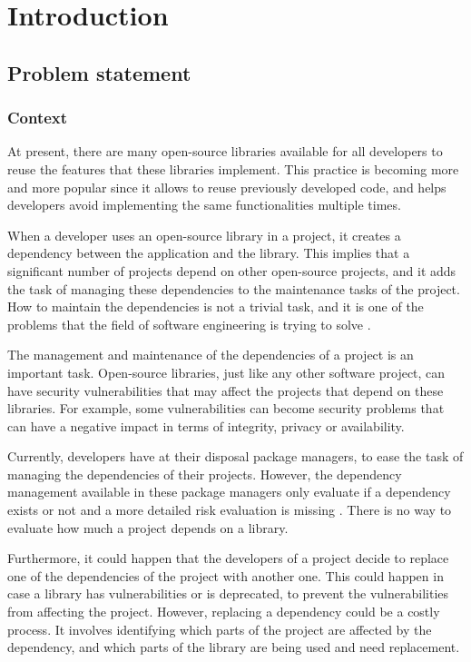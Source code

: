 \chapter{Introduction}\label{ch:Introduction}

\section{Problem statement}

\subsection{Context}
At present, there are many open-source libraries available for all developers to reuse the features that these libraries implement. This practice is becoming more and more popular since it allows to reuse previously developed code, and helps developers avoid implementing the same functionalities multiple times.

When a developer uses an open-source library in a project, it creates a dependency between the application and the library. This implies that a significant number of projects depend on other open-source projects, and it adds the task of managing these dependencies to the maintenance tasks of the project. How to maintain the dependencies is not a trivial task, and it is one of the problems that the field of software engineering is trying to solve \cite{kula2014visualizing}.

The management and maintenance of the dependencies of a project is an important task. Open-source libraries, just like any other software project, can have security vulnerabilities that may affect the projects that depend on these libraries. For example, some vulnerabilities can become security problems that can have a negative impact in terms of integrity, privacy or availability.

\blankl
Currently, developers have at their disposal package managers, to ease the task of managing the dependencies of their projects. However, the dependency management available in these package managers only evaluate if a dependency exists or not and a more detailed risk evaluation is missing \cite{hejderup2018prazi}. There is no way to evaluate how much a project depends on a library.

Furthermore, it could happen that the developers of a project decide to replace one of the dependencies of the project with another one. This could happen in case a library has vulnerabilities or is deprecated, to prevent the vulnerabilities from affecting the project. However, replacing a dependency could be a costly process. It involves identifying which parts of the project are affected by the dependency, and which parts of the library are being used and need replacement.

